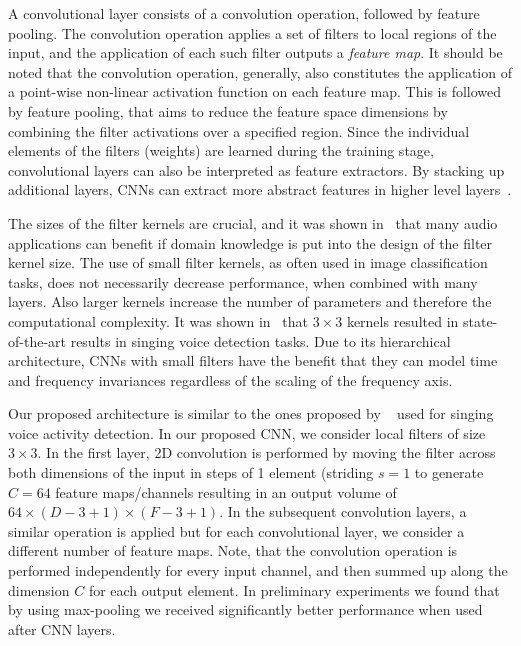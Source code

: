 A convolutional layer consists of a convolution operation, followed by feature pooling.
The convolution operation applies a set of filters to local regions of the input, and the application of each such filter outputs a \emph{feature map}.
It should be noted that the convolution operation, generally, also constitutes the application of a point-wise non-linear activation function on each feature map.
This is followed by feature pooling, that aims to reduce the feature space dimensions by combining the filter activations over a specified region.
Since the individual elements of the filters (weights) are learned during the training stage, convolutional layers can also be interpreted as feature extractors.
By stacking up additional layers, CNNs can extract more abstract features in higher level layers~\cite{Simonyan15}.
\par
The sizes of the filter kernels are crucial, and it was shown in~\cite{pons2017timbre} that many audio applications can benefit if domain knowledge is put into the design of the filter kernel size.
The use of small filter kernels, as often used in image classification tasks, does not necessarily decrease performance, when combined with many layers.
Also larger kernels increase the number of parameters and therefore the computational complexity.
It was shown in~\cite{schluter15} that \(3 \times 3\) kernels resulted in state-of-the-art results in singing voice detection tasks.
Due to its hierarchical architecture, CNNs with small filters have the benefit that they can model time and frequency invariances regardless of the scaling of the frequency axis.
\par
Our proposed architecture is similar to the ones proposed by ~\cite{schluter16} used for singing voice activity detection.
In our proposed CNN, we consider local filters of size \(3 \times 3\). In the first layer, 2D convolution is performed by moving the filter across both dimensions of the input in steps of 1 element (striding \(s = 1\) to generate \(C = 64\) feature maps/channels resulting in an output volume of \(64 \times (D - 3 + 1) \times (F - 3 + 1)\).
In the subsequent convolution layers, a similar operation is applied but for each convolutional layer, we consider a different number of feature maps.
Note, that the convolution operation is performed independently for every input channel, and then summed up along the dimension \(C\) for each output element.
In preliminary experiments we found that by using max-pooling we received significantly better performance when used after CNN layers.

